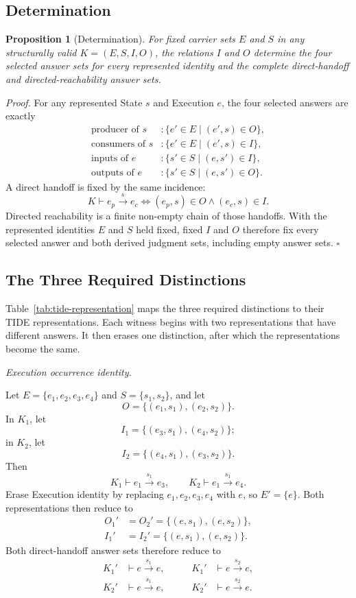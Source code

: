 \documentclass[conference]{IEEEtran}
\theoremstyle{tideproposition}
\newtheorem{proposition}{Proposition}
\newcommand{\direct}[3]{#1\xrightarrow{#2}#3}
\newcommand{\reviewitem}[1]{\par\addvspace{0.22\baselineskip}\noindent\emph{#1.}\ }
\begin{document}
\subsection{Determination}
\begin{proposition}[Determination]\label{prop:determination}
For fixed carrier sets $E$ and $S$ in any structurally valid $K=(E,S,I,O)$, the relations $I$ and $O$ determine the four selected answer sets for every represented identity and the complete direct-handoff and directed-reachability answer sets.
\end{proposition}
\noindent\emph{Proof.}
For any represented State $s$ and Execution $e$, the four selected answers are exactly
\begin{align*}
\text{producer of }s &: \{e'\in E\mid(e',s)\in O\},\\
\text{consumers of }s &: \{e'\in E\mid(e',s)\in I\},\\
\text{inputs of }e &: \{s'\in S\mid(e,s')\in I\},\\
\text{outputs of }e &: \{s'\in S\mid(e,s')\in O\}.
\end{align*}
A direct handoff is fixed by the same incidence:
\[
K\vdash\direct{e_p}{s}{e_c}
\Longleftrightarrow
(e_p,s)\in O\land(e_c,s)\in I.
\]
Directed reachability is a finite non-empty chain of those handoffs. With the represented identities $E$ and $S$ held fixed, fixed $I$ and $O$ therefore fix every selected answer and both derived judgment sets, including empty answer sets. \hfill$\square$

\subsection{The Three Required Distinctions}
Table~\ref{tab:tide-representation} maps the three required distinctions to their TIDE representations. Each witness begins with two representations that have different answers. It then erases one distinction, after which the representations become the same.

\reviewitem{Execution occurrence identity}\par\nobreak
Let $E=\{e_1,e_2,e_3,e_4\}$ and $S=\{s_1,s_2\}$, and let
\[
O=\{(e_1,s_1),(e_2,s_2)\}.
\]
In $K_1$, let
\[
I_1=\{(e_3,s_1),(e_4,s_2)\};
\]
in $K_2$, let
\[
I_2=\{(e_4,s_1),(e_3,s_2)\}.
\]
Then
\[
K_1\vdash\direct{e_1}{s_1}{e_3},
\qquad
K_2\vdash\direct{e_1}{s_1}{e_4}.
\]
Erase Execution identity by replacing $e_1,e_2,e_3,e_4$ with $e$, so $E'=\{e\}$. Both representations then reduce to
\[
\begin{aligned}
O_1'&=O_2'=\{(e,s_1),(e,s_2)\},\\
I_1'&=I_2'=\{(e,s_1),(e,s_2)\}.
\end{aligned}
\]
Both direct-handoff answer sets therefore reduce to
\[
\begin{aligned}
K_1'&\vdash\direct{e}{s_1}{e},
&\qquad K_1'&\vdash\direct{e}{s_2}{e},\\
K_2'&\vdash\direct{e}{s_1}{e},
&\qquad K_2'&\vdash\direct{e}{s_2}{e}.
\end{aligned}
\]
\end{document}
